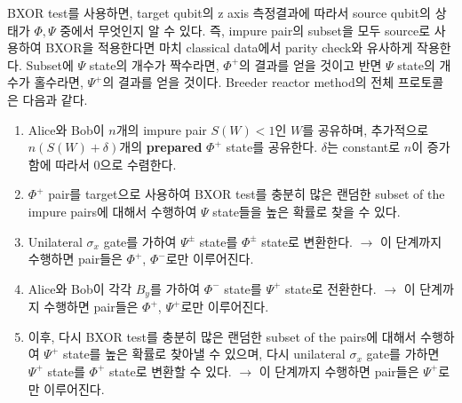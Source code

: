 \documentclass[
]{kaohandt}
\begin{document}
BXOR test를 사용하면, target qubit의 z axis 측정결과에 따라서 source qubit의 상태가 $\Phi, \Psi$ 중에서 무엇인지 알 수 있다. 즉, impure pair의 subset을 모두 source로 사용하여 BXOR을 적용한다면 마치 classical data에서 parity check와 유사하게 작용한다. 
Subset에 $\Psi$ state의 개수가 짝수라면, $\Phi^+$의 결과를 얻을 것이고 반면 $\Psi$ state의 개수가 홀수라면, $\Psi^+$의 결과를 얻을 것이다.
Breeder reactor method의 전체 프로토콜은 다음과 같다.
\begin{enumerate}
    \item Alice와 Bob이 $n$개의 impure pair $S(W) < 1$인 $W$를 공유하며, 추가적으로 $n(S(W) + \delta)$개의 \textbf{prepared} $\Phi^+$ state를 공유한다. $\delta$는 constant로 $n$이 증가함에 따라서 0으로 수렴한다.
    \item $\Phi^+$ pair를 target으로 사용하여 BXOR test를 충분히 많은 랜덤한 subset of the impure pairs에 대해서 수행하여  $\Psi$ state들을 높은 확률로 찾을 수 있다. 
    \item Unilateral $\sigma_x$ gate를 가하여 $\Psi^{\pm}$ state를 $\Phi^{\pm}$ state로 변환한다. $\rightarrow$ 이 단계까지 수행하면 pair들은 $\Phi^+$, $\Phi^-$로만 이루어진다.
    \item Alice와 Bob이 각각 $B_y$를 가하여 $\Phi^-$ state를 $\Psi^+$ state로 전환한다. $\rightarrow$ 이 단계까지 수행하면 pair들은 $\Phi^+$, $\Psi^+$로만 이루어진다.
    \item 이후, 다시 BXOR test를 충분히 많은 랜덤한 subset of the pairs에 대해서 수행하여 $\Psi^+$ state를 높은 확률로 찾아낼 수 있으며, 다시 unilateral $\sigma_x$ gate를 가하면 $\Psi^+$ state를 $\Phi^+$ state로 변환할 수 있다. $\rightarrow$ 이 단계까지 수행하면 pair들은 $\Psi^+$로만 이루어진다.
\end{enumerate}
\end{document}
